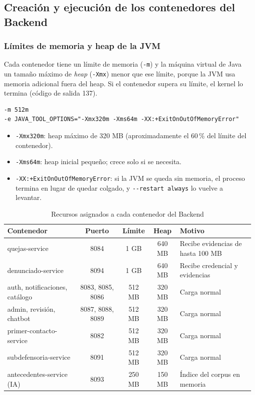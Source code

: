 \subsection{Creación y ejecución de los contenedores del Backend}\label{sec:6_3_contenedor_backend}

\subsubsection{Límites de memoria y heap de la JVM}
Cada contenedor tiene un límite de memoria (\texttt{-m}) y la máquina virtual de Java un tamaño máximo de \emph{heap} (\texttt{-Xmx}) menor que ese límite, porque la JVM usa memoria adicional fuera del heap. Si el contenedor supera su límite, el kernel lo termina (código de salida 137).
\begin{lstlisting}
-m 512m
-e JAVA_TOOL_OPTIONS="-Xmx320m -Xms64m -XX:+ExitOnOutOfMemoryError"
\end{lstlisting}
\begin{itemize}
  \item \texttt{-Xmx320m}: heap máximo de 320 MB (aproximadamente el 60\,\% del límite del contenedor).
  \item \texttt{-Xms64m}: heap inicial pequeño; crece solo si se necesita.
  \item \texttt{-XX:+ExitOnOutOfMemoryError}: si la JVM se queda sin memoria, el proceso termina en lugar de quedar colgado, y \texttt{-{}-restart always} lo vuelve a levantar.
\end{itemize}

\begin{table}[H]
\centering
\caption{Recursos asignados a cada contenedor del Backend}
\footnotesize
\begin{tabular}{lcccl}
\toprule
\textbf{Contenedor} & \textbf{Puerto} & \textbf{Límite} & \textbf{Heap} & \textbf{Motivo} \\
\midrule
quejas-service & 8084 & 1 GB & 640 MB & Recibe evidencias de hasta 100 MB \\
denunciado-service & 8094 & 1 GB & 640 MB & Recibe credencial y evidencias \\
auth, notificaciones, catálogo & 8083, 8085, 8086 & 512 MB & 320 MB & Carga normal \\
admin, revisión, chatbot & 8087, 8088, 8089 & 512 MB & 320 MB & Carga normal \\
primer-contacto-service & 8082 & 512 MB & 320 MB & Carga normal \\
subdefensoria-service & 8091 & 512 MB & 320 MB & Carga normal \\
antecedentes-service (IA) & 8093 & 250 MB & 150 MB & Índice del corpus en memoria \\
\bottomrule
\end{tabular}
\end{table}

